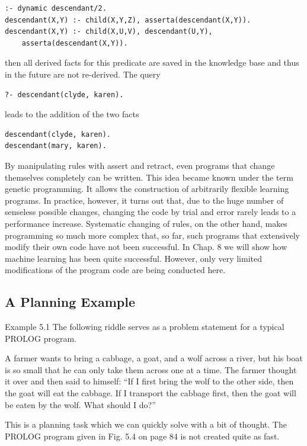 \documentclass[10pt]{book}
\begin{document}
\begin{verbatim}
:- dynamic descendant/2.
descendant(X,Y) :- child(X,Y,Z), asserta(descendant(X,Y)).
descendant(X,Y) :- child(X,U,V), descendant(U,Y),
    asserta(descendant(X,Y)).
\end{verbatim}

then all derived facts for this predicate are saved in the knowledge base and thus in the future are not re-derived. The query

\begin{verbatim}
?- descendant(clyde, karen).
\end{verbatim}

leads to the addition of the two facts

\begin{verbatim}
descendant(clyde, karen).
descendant(mary, karen).
\end{verbatim}

By manipulating rules with assert and retract, even programs that change themselves completely can be written. This idea became known under the term genetic programming. It allows the construction of arbitrarily flexible learning programs. In practice, however, it turns out that, due to the huge number of senseless possible changes, changing the code by trial and error rarely leads to a performance increase. Systematic changing of rules, on the other hand, makes programming so much more complex that, so far, such programs that extensively modify their own code have not been successful. In Chap. 8 we will show how machine learning has been quite successful. However, only very limited modifications of the program code are being conducted here.

\subsection{A Planning Example}
Example 5.1 The following riddle serves as a problem statement for a typical PROLOG program.

A farmer wants to bring a cabbage, a goat, and a wolf across a river, but his boat is so small that he can only take them across one at a time. The farmer thought it over and then said to himself: ``If I first bring the wolf to the other side, then the goat will eat the cabbage. If I transport the cabbage first, then the goat will be eaten by the wolf. What should I do?''

This is a planning task which we can quickly solve with a bit of thought. The PROLOG program given in Fig. 5.4 on page 84 is not created quite as fast.
\end{document}
